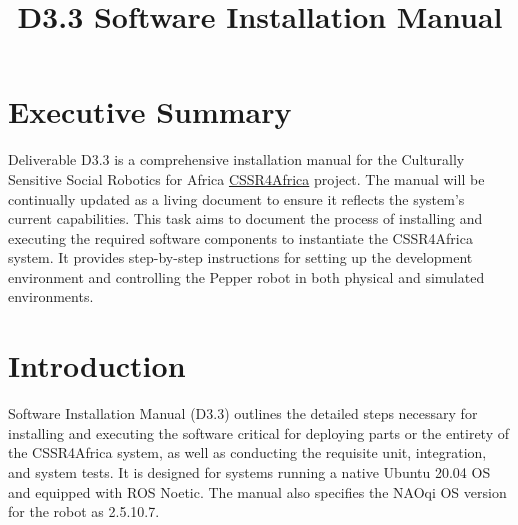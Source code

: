 \documentclass{CSSRforAfrica}
\newcommand{\blank}{~\\}
\begin{document}
	
	
	
	\title{D3.3 Software Installation Manual}    
	
	\partner{}                                      
	
	
	
	\maketitle
	
	\section*{Executive Summary}
	Deliverable D3.3 is a comprehensive installation manual for the Culturally Sensitive Social Robotics for Africa \href{https://cssr4africa.github.io/}{CSSR4Africa} project. The manual will be continually updated as a living document to ensure it reflects the system's current capabilities. This task aims to document the process of installing and executing the required software components to instantiate the CSSR4Africa system. It provides step-by-step instructions for setting up the development environment and controlling the Pepper robot in both physical and simulated environments.
	\label{executive_summary}
	
	\pagebreak
	\tableofcontents
	\pagebreak
	
	
	\pagebreak
	
	
	\section{Introduction}
	Software Installation Manual (D3.3) outlines the detailed steps necessary for installing and executing the software critical for deploying parts or the entirety of the CSSR4Africa system, as well as conducting the requisite unit, integration, and system tests. It is designed for systems running a native Ubuntu 20.04 OS and equipped with ROS Noetic. The manual also specifies the NAOqi OS version for the robot as 2.5.10.7.
	
\end{document}

